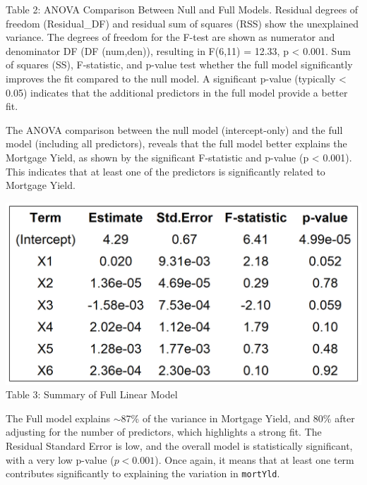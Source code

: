 \documentclass[
  12pt,
]{article}
\begin{document}
\noindent \fontsize{12}{14}\selectfont Table 2: ANOVA Comparison Between
Null and Full Models. Residual degrees of freedom (Residual\_DF) and
residual sum of squares (RSS) show the unexplained variance. The degrees
of freedom for the F-test are shown as numerator and denominator DF (DF
(num,den)), resulting in F(6,11) = 12.33, p \textless{} 0.001. Sum of
squares (SS), F-statistic, and p-value test whether the full model
significantly improves the fit compared to the null model. A significant
p-value (typically \textless{} 0.05) indicates that the additional
predictors in the full model provide a better fit.

The ANOVA comparison between the null model (intercept-only) and the
full model (including all predictors), reveals that the full model
better explains the Mortgage Yield, as shown by the significant
F-statistic and p-value (p \textless{} 0.001). This indicates that at
least one of the predictors is significantly related to Mortgage Yield.

\begin{minipage}{0.42\textwidth}
\includegraphics[width=1\linewidth]{figures/full_model_summary_table.png}
\vspace{-0.1em}
{\fontsize{12}{14}\selectfont Table 3: Summary of Full Linear Model}
\end{minipage}
\hfill
\begin{minipage}{0.55\textwidth}
The Full model explains $\sim$87\% of the variance in Mortgage Yield, and 80\% after adjusting for the number of predictors, which highlights a strong fit. The Residual Standard Error is low, and the overall model is statistically significant, with a very low p-value ($p < 0.001$). Once again, it means that at least one term contributes significantly to explaining the variation in \texttt{mortYld}.
\end{minipage}
\end{document}
